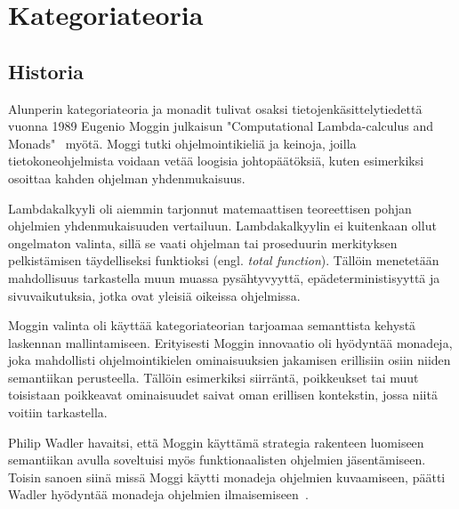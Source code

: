 \documentclass[finnish]{tktltiki2}
\begin{document}
\section{Kategoriateoria}

\subsection{Historia}

Alunperin kategoriateoria ja monadit tulivat osaksi tietojenkäsittelytiedettä vuonna 1989 Eugenio
Moggin julkaisun "Computational Lambda-calculus and Monads"~\cite{clcam89,nocam91} myötä. Moggi
tutki ohjelmointikieliä ja keinoja, joilla tietokoneohjelmista voidaan vetää loogisia
johtopäätöksiä, kuten esimerkiksi osoittaa kahden ohjelman yhdenmukaisuus.

Lambdakalkyyli oli aiemmin tarjonnut matemaattisen teoreettisen pohjan ohjelmien yhdenmukaisuuden
vertailuun. Lambdakalkyylin ei kuitenkaan ollut ongelmaton valinta, sillä se vaati ohjelman tai
proseduurin merkityksen pelkistämisen täydelliseksi funktioksi (engl. \emph{total function}).
Tällöin menetetään mahdollisuus tarkastella muun muassa pysähtyvyyttä, epädeterministisyyttä ja
sivuvaikutuksia, jotka ovat yleisiä oikeissa ohjelmissa.

%

Moggin valinta oli käyttää kategoriateorian tarjoamaa semanttista kehystä laskennan mallintamiseen.
Erityisesti Moggin innovaatio oli hyödyntää monadeja, joka mahdollisti ohjelmointikielen
ominaisuuksien jakamisen erillisiin osiin niiden semantiikan perusteella. Tällöin esimerkiksi
siirräntä, poikkeukset tai muut toisistaan poikkeavat ominaisuudet saivat oman erillisen kontekstin,
jossa niitä voitiin tarkastella.

Philip Wadler havaitsi, että Moggin käyttämä strategia rakenteen luomiseen semantiikan avulla
soveltuisi myös funktionaalisten ohjelmien jäsentämiseen. Toisin sanoen siinä missä Moggi käytti
monadeja ohjelmien kuvaamiseen, päätti Wadler hyödyntää monadeja ohjelmien
ilmaisemiseen~\cite{cm90,teofp92}.
\end{document}
